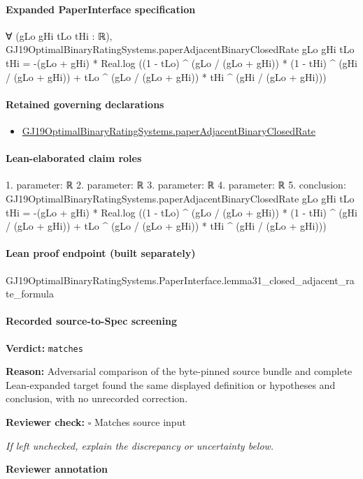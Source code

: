 \documentclass[10pt]{article}
\newcommand{\reviewerbox}{%
  \par\noindent\fbox{\parbox{0.96\linewidth}{\rule{0pt}{0.38in}}}\par
}
\newcommand{\reviewmatch}[1]{%
  \par\noindent\textbf{Reviewer check:} $\square$\; #1\par
  \noindent\emph{If left unchecked, explain the discrepancy or uncertainty below.}\par
}
\begin{document}
\paragraph{Expanded PaperInterface specification}
\begin{ReviewVerbatim}
∀ (gLo gHi tLo tHi : ℝ),
  GJ19OptimalBinaryRatingSystems.paperAdjacentBinaryClosedRate gLo gHi tLo tHi =
    -(gLo + gHi) *
      Real.log
        ((1 - tLo) ^ (gLo / (gLo + gHi)) * (1 - tHi) ^ (gHi / (gLo + gHi)) +
          tLo ^ (gLo / (gLo + gHi)) * tHi ^ (gHi / (gLo + gHi)))
\end{ReviewVerbatim}

\paragraph{Retained governing declarations}
\begin{itemize}\raggedright
\item \hyperlink{governing-declaration-40e66afb06d73da3}{GJ19\allowbreak{}Optimal\allowbreak{}Binary\allowbreak{}Rating\allowbreak{}Systems.\allowbreak{}paper\allowbreak{}Adjacent\allowbreak{}Binary\allowbreak{}Closed\allowbreak{}Rate}
\end{itemize}
\paragraph{Lean-elaborated claim roles}\begin{ReviewVerbatim}
1. parameter: ℝ
2. parameter: ℝ
3. parameter: ℝ
4. parameter: ℝ
5. conclusion: GJ19OptimalBinaryRatingSystems.paperAdjacentBinaryClosedRate gLo gHi tLo tHi =
  -(gLo + gHi) *
    Real.log
      ((1 - tLo) ^ (gLo / (gLo + gHi)) * (1 - tHi) ^ (gHi / (gLo + gHi)) +
        tLo ^ (gLo / (gLo + gHi)) * tHi ^ (gHi / (gLo + gHi)))
\end{ReviewVerbatim}

\paragraph{Lean proof endpoint (built separately)}\begin{ReviewVerbatim}
GJ19OptimalBinaryRatingSystems.PaperInterface.lemma31_closed_adjacent_rate_formula
\end{ReviewVerbatim}

\paragraph{Recorded source-to-Spec screening}
\textbf{Verdict:} \texttt{matches}
\\
{\raggedright
\textbf{Reason:} Adversarial comparison of the byte-\allowbreak{}pinned source bundle and complete Lean-\allowbreak{}expanded target found the same displayed definition or hypotheses and conclusion, with no unrecorded correction.\allowbreak{}
\par}
\reviewmatch{Matches source input}
\noindent\textbf{Reviewer annotation}\par
\reviewerbox
\clearpage
\hypertarget{source-claim-9c02a19f4b41b0c2}{}
\end{document}
